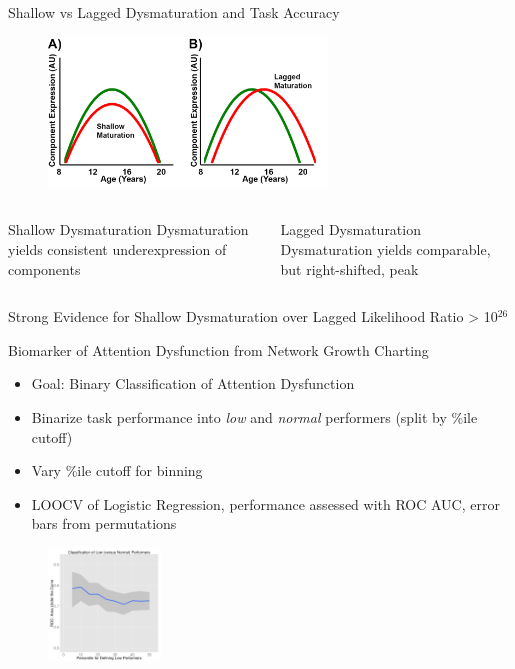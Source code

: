 \documentclass[presentation]{beamer}
\begin{document}
\begin{frame}[label={sec:orgheadline22}]{Shallow vs Lagged Dysmaturation and Task Accuracy}
\begin{figure}[htb]
\centering
\includegraphics[height=4cm]{./Figures/eFig7.png}
\end{figure}
\begin{columns}
\begin{column}{.5\columnwidth}
\alert{Shallow Dysmaturation}
Dysmaturation yields consistent underexpression of components
\end{column}
\begin{column}{.5\columnwidth}
\alert{Lagged Dysmaturation}
Dysmaturation yields comparable, but right-shifted, peak
\end{column}
\end{columns}
\begin{block}{Strong Evidence for Shallow Dysmaturation over Lagged}
Likelihood Ratio > 10\(^{\text{26}}\)
\end{block}
\end{frame}
\begin{frame}[label={sec:orgheadline23}]{Biomarker of Attention Dysfunction from Network Growth Charting}
\begin{itemize}
\item Goal: Binary Classification of Attention Dysfunction
\item Binarize task performance into \emph{low} and \emph{normal} performers (split by \%ile cutoff)
\item Vary \%ile cutoff for binning
\item LOOCV of Logistic Regression, performance assessed with ROC AUC, error bars from permutations
\end{itemize}
\begin{figure}[htb]
\centering
\includegraphics[height=3cm]{./Figures/Figure4.png}
\end{figure}
\end{frame}
\end{document}
